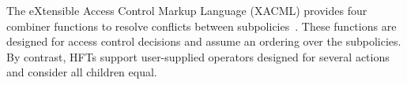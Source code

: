 %


The eXtensible Access Control Markup Language (XACML) provides
four combiner functions to resolve conflicts between subpolicies~\cite{gm:xacml-1.1}.
These functions are designed for access control decisions and assume an ordering
over the subpolicies. %
By contrast, HFTs support user-supplied operators designed for several actions
and consider all children equal.
